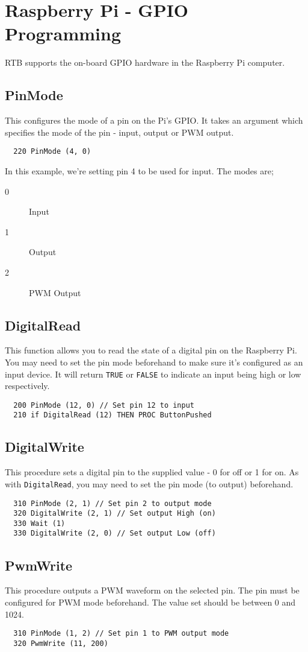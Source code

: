 \chapter{Raspberry Pi - GPIO Programming}
RTB supports the on-board GPIO hardware in the Raspberry Pi computer.

\section{PinMode}
This configures the mode of a pin on the Pi's GPIO. It takes
an argument which specifies the mode of the pin - input, output or PWM
output. 
\begin{verbatim}
  220 PinMode (4, 0)
\end{verbatim}
In this example, we're setting pin 4 to be used for input. The modes are;
\begin{description}
\item[0] Input
\item[1] Output
\item[2] PWM Output
\end{description}

\section{DigitalRead}
This function allows you to read the state of a digital pin on the
Raspberry Pi. You may need to set the pin mode beforehand to make
sure it's
configured as an input device. It will return {\tt TRUE} or {\tt FALSE}
to indicate an input being high or low respectively.
\begin{verbatim}
  200 PinMode (12, 0) // Set pin 12 to input
  210 if DigitalRead (12) THEN PROC ButtonPushed
\end{verbatim}

\section{DigitalWrite}
This procedure sets a digital pin to the supplied value - 0 for off or
1 for on. As with {\tt DigitalRead}, you may need to set the pin mode
(to output) beforehand.
\begin{verbatim}
  310 PinMode (2, 1) // Set pin 2 to output mode
  320 DigitalWrite (2, 1) // Set output High (on)
  330 Wait (1)
  330 DigitalWrite (2, 0) // Set output Low (off)
\end{verbatim} 

\section{PwmWrite}
This procedure outputs a PWM waveform on the selected pin. The pin must
be configured for PWM mode beforehand.
The value set should be between 0 and 1024.
\begin{verbatim}
  310 PinMode (1, 2) // Set pin 1 to PWM output mode
  320 PwmWrite (11, 200)
\end{verbatim} 
